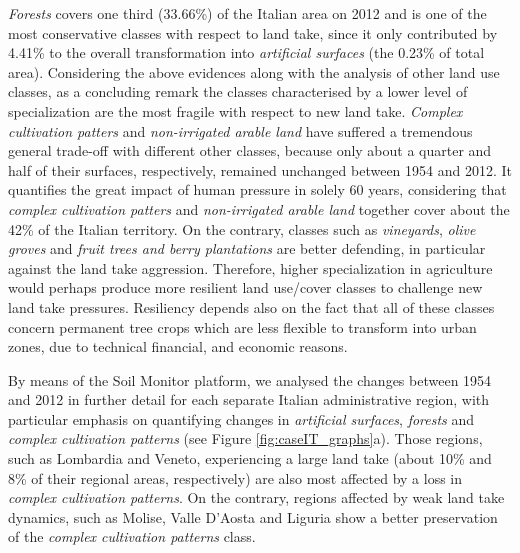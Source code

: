 \documentclass[APA,LATO1COL,doublespace]{WileyNJD-v2}
\begin{document}
\textit{Forests} covers one third (33.66\%) of the Italian area on 2012 and is one of the most conservative classes with respect to land take, since it only contributed by 4.41\% to the overall transformation into \textit{artificial surfaces} (the 0.23\% of total area).
Considering the above evidences along with the analysis of other land use classes, as a concluding remark the classes characterised by a lower level of specialization are the most fragile with respect to new land take.
\textit{Complex cultivation patters} and \textit{non-irrigated arable land} have suffered a tremendous general trade-off with different other classes, because only about a quarter and half of their surfaces, respectively, remained unchanged between 1954 and 2012.
It quantifies the great impact of human pressure in solely 60 years, considering that \textit{complex cultivation patters} and \textit{non-irrigated arable land} together cover about the 42\% of the Italian territory.
On the contrary, classes such as \textit{vineyards}, \textit{olive groves} and \textit{fruit trees and berry plantations} are better defending, in particular against the land take aggression.
Therefore, higher specialization in agriculture would perhaps produce more resilient land use/cover classes to challenge new land take pressures.
Resiliency depends also on the fact that all of these classes concern permanent tree crops which are less flexible to transform into urban zones, due to technical financial, and economic reasons.

By means of the Soil Monitor platform, we analysed the changes between 1954 and 2012 in further detail
for each separate Italian administrative region, with particular emphasis on quantifying changes in \textit{artificial surfaces}, \textit{forests} and \textit{complex cultivation patterns} (see Figure \ref{fig:caseIT_graphs}a).
Those regions, such as Lombardia and Veneto, experiencing a large land take (about 10\% and 8\% of their regional areas, respectively) are also most affected by a loss in \textit{complex cultivation patterns}.
On the contrary, regions affected by weak land take dynamics, such as Molise, Valle D'Aosta and Liguria show a better preservation of the \textit{complex cultivation patterns} class.
\end{document}
